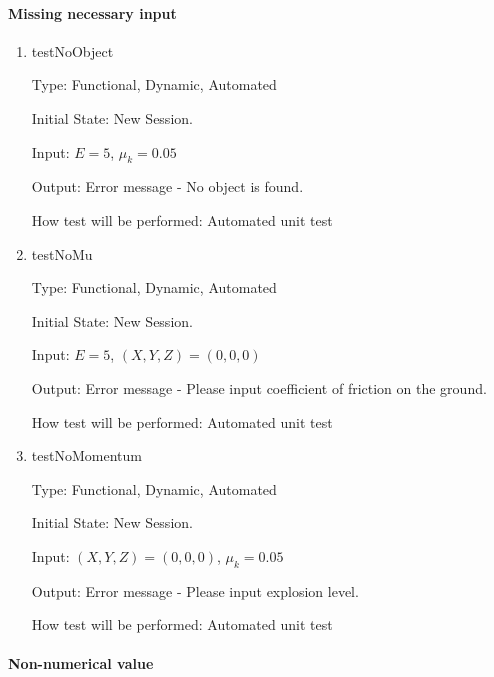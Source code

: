 \documentclass[12pt, titlepage]{article}
\begin{document}
\paragraph{Missing necessary input}

\begin{enumerate}
	
\item{testNoObject\\}

Type: Functional, Dynamic, Automated
					
Initial State: New Session.
					
Input: $E = 5$, $\mu_{k} = 0.05$
					
Output: Error message - No object is found.
					
How test will be performed: Automated unit test
					
\item{testNoMu\\}

Type: Functional, Dynamic, Automated

Initial State: New Session.

Input: $E = 5$, $(X,Y,Z) = (0,0,0)$  

Output: Error message - Please input coefficient of friction on the ground.

How test will be performed: Automated unit test

\item{testNoMomentum\\}

Type: Functional, Dynamic, Automated

Initial State: New Session.

Input: $(X,Y,Z) = (0,0,0)$, $\mu_{k} = 0.05$  

Output: Error message - Please input explosion level.

How test will be performed: Automated unit test

\end{enumerate}

\paragraph{Non-numerical value}
\end{document}
